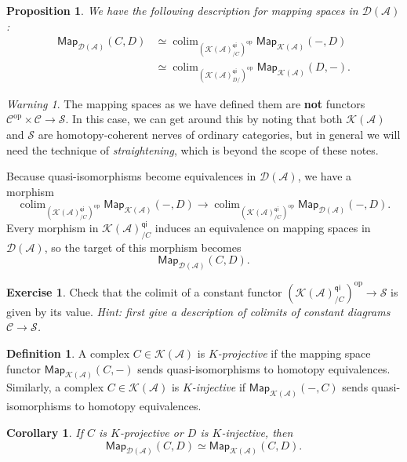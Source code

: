 \documentclass[10pt, oneside]{memoir}
\newtheorem{cor}[thm]{Corollary}
\newtheorem{prop}[thm]{Proposition}
\theoremstyle{definition}
\newtheorem{defn}[thm]{Definition}
\newtheorem{exer}[thm]{Exercise}
\theoremstyle{remark}
\newtheorem{warn}[thm]{Warning}
\theoremstyle{plain}
\theoremstyle{definition}
\theoremstyle{remark}
\newcommand{\mc}[1]{\mathcal{#1}}
\newcommand{\ms}[1]{\mathsf{#1}}
\newcommand{\1}{\mathbf{1}}
\newcommand{\2}{\mathbf{2}}
\newcommand{\3}{\mathbf{3}}
\DeclareMathOperator{\op}{op}
\DeclareMathOperator*{\colim}{colim}
\begin{document}
\begin{prop}
    We have the following description for mapping spaces in \(\mc{D}(\mc{A}) \):
    \begin{align*}
        \ms{Map}_{\mc{D}(\mc{A})}(C, D) &\simeq \colim_{(\mc{K}(\mc{A})_{/C}^{\ms{qi}})^{\op}} \ms{Map}_{\mc{K}(\mc{A})}(-, D) \\
        &\simeq \colim_{(\mc{K}(\mc{A})_{D/}^{\ms{qi}})^{\op}} \ms{Map}_{\mc{K}(\mc{A})}(D, -).
    \end{align*}
\end{prop}

\begin{warn}
    The mapping spaces as we have defined them are \textbf{not} functors \(\mc{C}^{\op} \times \mc{C} \to \mc{S} \). In this case, we can get around this by noting that both \(\mc{K}(\mc{A}) \) and \(\mc{S} \) are homotopy-coherent nerves of ordinary categories, but in general we will need the technique of \textit{straightening}, which is beyond the scope of these notes.
\end{warn}

Because quasi-isomorphisms become equivalences in \(\mc{D}(\mc{A}) \), we have a morphism
\[ \colim_{(\mc{K}(\mc{A})_{/C}^{\ms{qi}})^{\op}} \ms{Map}_{\mc{K}(\mc{A})}(-, D) \to \colim_{(\mc{K}(\mc{A})_{/C}^{\ms{qi}})^{\op}} \ms{Map}_{\mc{D}(\mc{A})}(-, D). \]
Every morphism in \(\mc{K}(\mc{A})_{/C}^{\ms{qi}} \) induces an equivalence on mapping spaces in \(\mc{D}(\mc{A}) \), so the target of this morphism becomes
\[ \ms{Map}_{\mc{D}(\mc{A})}(C, D). \]

\begin{exer}
    Check that the colimit of a constant functor \((\mc{K}(\mc{A})_{/C}^{\ms{qi}})^{\op} \to \mc{S} \) is given by its value. \textit{Hint: first give a description of colimits of constant diagrams \(\mc{C} \to \mc{S} \).}
\end{exer}

\begin{defn}
    A complex \(C \in \mc{K}(\mc{A}) \) is \textit{\(K \)-projective} if the mapping space functor \(\ms{Map}_{\mc{K}(\mc{A})}(C, -) \) sends quasi-isomorphisms to homotopy equivalences. Similarly, a complex \(C \in \mc{K}(\mc{A}) \) is \textit{\(K \)-injective} if \(\ms{Map}_{\mc{K}(\mc{A})}(-, C) \) sends quasi-isomorphisms to homotopy equivalences.
\end{defn}

\begin{cor}
    If \(C \) is \(K \)-projective or \(D \) is \(K \)-injective, then 
    \[ \ms{Map}_{\mc{D}(\mc{A})} (C, D) \simeq \ms{Map}_{\mc{K}(\mc{A})}(C, D). \]
\end{cor}
\end{document}

